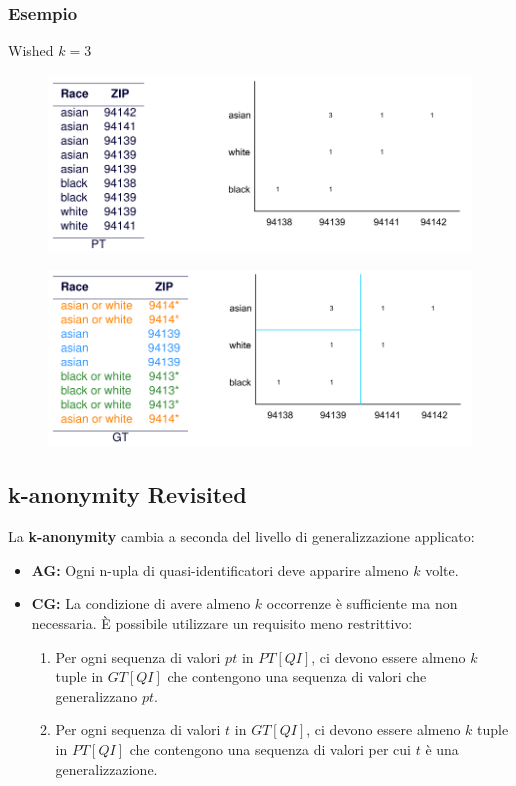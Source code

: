 \documentclass{report}
\begin{document}
\newpage
\subsubsection{Esempio}
Wished $k = 3$
\begin{figure}[ht]
    \centering
    \includegraphics[width=1\linewidth]{images/mondrian1.png}
\end{figure}
\begin{figure}[ht]
    \centering
    \includegraphics[width=1\linewidth]{images/mondrian2.png}
\end{figure}

\subsection{k-anonymity Revisited}
La \textbf{k-anonymity} cambia a seconda del livello di generalizzazione applicato:

\begin{itemize}
    \item \textbf{AG:} Ogni n-upla di quasi-identificatori deve apparire almeno $k$ volte.
    \item \textbf{CG:} La condizione di avere almeno $k$ occorrenze è sufficiente ma non necessaria. È possibile utilizzare un requisito meno restrittivo:
    \begin{enumerate}
        \item Per ogni sequenza di valori $pt$ in $\mathit{PT[QI]}$, ci devono essere almeno $k$ tuple in $\mathit{GT[QI]}$ che contengono una sequenza di valori che generalizzano $pt$.
        \item Per ogni sequenza di valori $t$ in $\mathit{GT[QI]}$, ci devono essere almeno $k$ tuple in $\mathit{PT[QI]}$ che contengono una sequenza di valori per cui $t$ è una generalizzazione.
    \end{enumerate}
\end{itemize}
\end{document}
